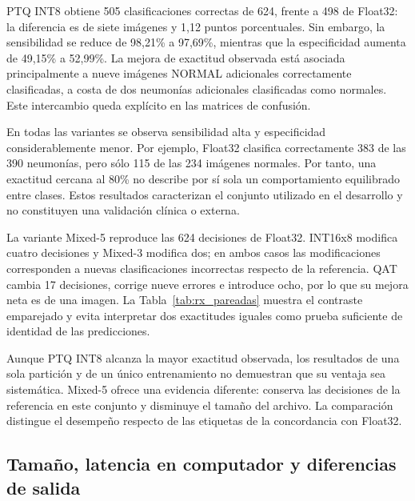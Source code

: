 PTQ INT8 obtiene 505 clasificaciones correctas de 624, frente a 498 de Float32: la diferencia es de siete imágenes y 1,12 puntos porcentuales. Sin embargo, la sensibilidad se reduce de 98,21\% a 97,69\%, mientras que la especificidad aumenta de 49,15\% a 52,99\%. La mejora de exactitud observada está asociada principalmente a nueve imágenes NORMAL adicionales correctamente clasificadas, a costa de dos neumonías adicionales clasificadas como normales. Este intercambio queda explícito en las matrices de confusión.


En todas las variantes se observa sensibilidad alta y especificidad considerablemente menor. Por ejemplo, Float32 clasifica correctamente 383 de las 390 neumonías, pero sólo 115 de las 234 imágenes normales. Por tanto, una exactitud cercana al 80\% no describe por sí sola un comportamiento equilibrado entre clases. Estos resultados caracterizan el conjunto utilizado en el desarrollo y no constituyen una validación clínica o externa.

La variante Mixed-5 reproduce las 624 decisiones de Float32. INT16x8 modifica cuatro decisiones y Mixed-3 modifica dos; en ambos casos las modificaciones corresponden a nuevas clasificaciones incorrectas respecto de la referencia. QAT cambia 17 decisiones, corrige nueve errores e introduce ocho, por lo que su mejora neta es de una imagen. La Tabla~\ref{tab:rx_pareadas} muestra el contraste emparejado y evita interpretar dos exactitudes iguales como prueba suficiente de identidad de las predicciones.


Aunque PTQ INT8 alcanza la mayor exactitud observada, los resultados de una sola partición y de un único entrenamiento no demuestran que su ventaja sea sistemática. Mixed-5 ofrece una evidencia diferente: conserva las decisiones de la referencia en este conjunto y disminuye el tamaño del archivo. La comparación distingue el desempeño respecto de las etiquetas de la concordancia con Float32.

\FloatBarrier
\subsection{Tamaño, latencia en computador y diferencias de salida}


